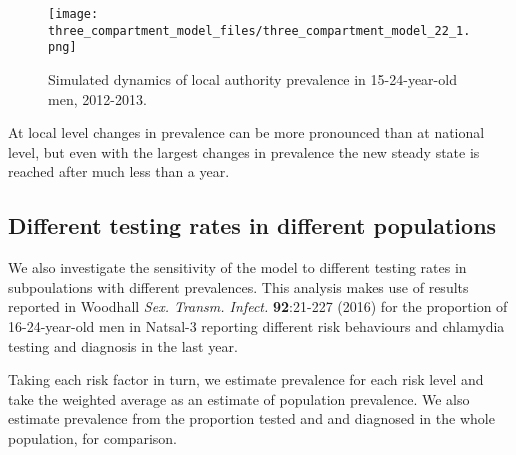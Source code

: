 \documentclass{article}
\begin{document}
    \begin{figure}
        \begin{center}\texttt{[image: three\_compartment\_model\_files/three\_compartment\_model\_22\_1.png]}\end{center}
        \caption{Simulated dynamics of local authority prevalence in 15-24-year-old men, 2012-2013.}
        \label{}
    \end{figure}
    
    At local level changes in prevalence can be more pronounced than at
national level, but even with the largest changes in prevalence the new
steady state is reached after much less than a year.

\subsection{Different testing rates in different
populations}\label{different-testing-rates-in-different-populations}

We also investigate the sensitivity of the model to different testing
rates in subpoulations with different prevalences. This analysis makes
use of results reported in Woodhall \emph{Sex. Transm. Infect.}
\textbf{92}:21-227 (2016) for the proportion of 16-24-year-old men in
Natsal-3 reporting different risk behaviours and chlamydia testing and
diagnosis in the last year.

Taking each risk factor in turn, we estimate prevalence for each risk
level and take the weighted average as an estimate of population
prevalence. We also estimate prevalence from the proportion tested and
and diagnosed in the whole population, for comparison.
\end{document}
